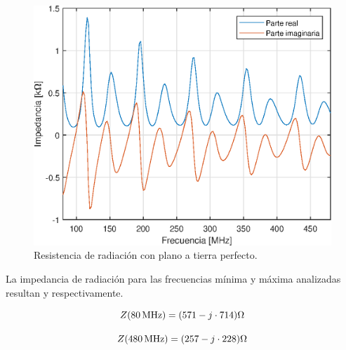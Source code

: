 \begin{figure}[H]
	\centering
	\includegraphics{imagenes/z_tierra.eps}
	\caption{Resistencia de radiación con plano a tierra perfecto.}
	\label{fig.z_radiacion}
\end{figure}


La impedancia de radiación para las frecuencias mínima y máxima analizadas resultan \label{ec.z_80_tierra} y \label{ec.z_480_tierra} respectivamente.

\begin{equation}
	\centering
	Z(\SI{80}{\mega\hertz}) = (571 - j \cdot 714) \Omega
	\label{ec.z_80_tierra}
\end{equation}

\begin{equation}
	\centering
	Z(\SI{480}{\mega\hertz}) = (257 -j \cdot 228) \Omega
	\label{ec.z_480_tierra}
\end{equation}		
